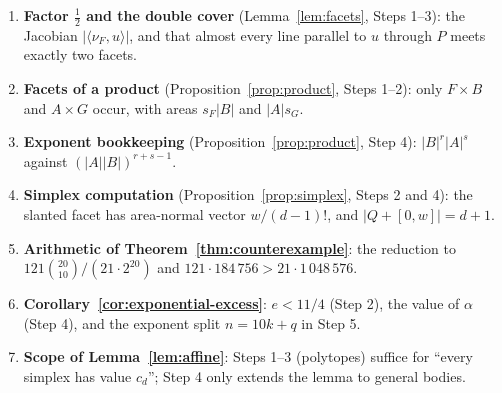 \documentclass[11pt]{article}
\begin{document}
\begin{enumerate}[nosep]
\item \textbf{Factor \(\tfrac12\) and the double cover} (Lemma~\ref{lem:facets}, Steps 1--3): the Jacobian \(|\langle\nu_F,u\rangle|\), and that almost every line parallel to \(u\) through \(P\) meets exactly two facets.
\item \textbf{Facets of a product} (Proposition~\ref{prop:product}, Steps 1--2): only \(F\times B\) and \(A\times G\) occur, with areas \(s_F|B|\) and \(|A|s_G\).
\item \textbf{Exponent bookkeeping} (Proposition~\ref{prop:product}, Step 4): \(|B|^r|A|^s\) against \((|A||B|)^{r+s-1}\).
\item \textbf{Simplex computation} (Proposition~\ref{prop:simplex}, Steps 2 and 4): the slanted facet has area-normal vector \(w/(d-1)!\), and \(|Q+[0,w]|=d+1\).
\item \textbf{Arithmetic of Theorem~\ref{thm:counterexample}}: the reduction to \(121\binom{20}{10}/(21\cdot2^{20})\) and \(121\cdot184\,756>21\cdot1\,048\,576\).
\item \textbf{Corollary~\ref{cor:exponential-excess}}: \(e<11/4\) (Step 2), the value of \(\alpha\) (Step 4), and the exponent split \(n=10k+q\) in Step 5.
\item \textbf{Scope of Lemma~\ref{lem:affine}}: Steps 1--3 (polytopes) suffice for ``every simplex has value \(c_d\)''; Step 4 only extends the lemma to general bodies.
\end{enumerate}
\end{document}

